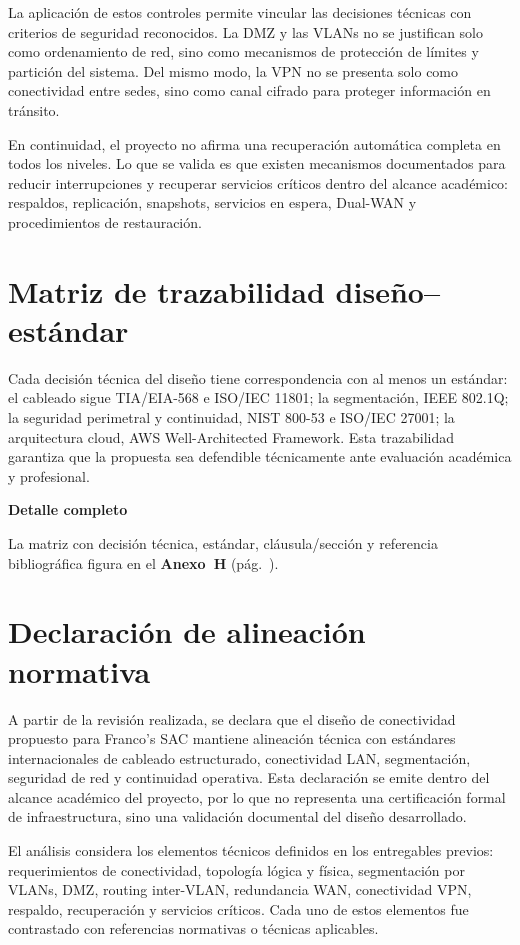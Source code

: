 \documentclass[11pt, a4paper, oneside]{report}
\newenvironment{notabox}[1]{%
  \begin{lrbox}{\notaboxsb}%
  \begin{minipage}{\dimexpr\textwidth-2\fboxsep\relax}%
  \vspace{4pt}\textcolor{upeu_dark}{\textbf{#1}}\\[2pt]\small%
}{%
  \vspace{4pt}%
  \end{minipage}%
  \end{lrbox}%
  \vspace{6pt}\par\noindent\colorbox{upeu_light}{\usebox{\notaboxsb}}\par\vspace{6pt}%
}
\begin{document}
\normalsize

La aplicación de estos controles permite vincular las decisiones técnicas con criterios de seguridad reconocidos. La DMZ y las VLANs no se justifican solo como ordenamiento de red, sino como mecanismos de protección de límites y partición del sistema. Del mismo modo, la VPN no se presenta solo como conectividad entre sedes, sino como canal cifrado para proteger información en tránsito.

En continuidad, el proyecto no afirma una recuperación automática completa en todos los niveles. Lo que se valida es que existen mecanismos documentados para reducir interrupciones y recuperar servicios críticos dentro del alcance académico: respaldos, replicación, snapshots, servicios en espera, Dual-WAN y procedimientos de restauración.

\section{Matriz de trazabilidad diseño--estándar}

Cada decisión técnica del diseño tiene correspondencia con al menos un estándar: el cableado sigue TIA/EIA-568 e ISO/IEC 11801; la segmentación, IEEE 802.1Q; la seguridad perimetral y continuidad, NIST 800-53 e ISO/IEC 27001; la arquitectura cloud, AWS Well-Architected Framework. Esta trazabilidad garantiza que la propuesta sea defendible técnicamente ante evaluación académica y profesional.

\begin{notabox}{Detalle completo}
La matriz con decisión técnica, estándar, cláusula/sección y referencia bibliográfica figura en el \textbf{Anexo~H} (pág.~\pageref{anex:trazabilidad}).
\end{notabox}
\section{Declaración de alineación normativa}

A partir de la revisión realizada, se declara que el diseño de conectividad propuesto para Franco's SAC mantiene alineación técnica con estándares internacionales de cableado estructurado, conectividad LAN, segmentación, seguridad de red y continuidad operativa. Esta declaración se emite dentro del alcance académico del proyecto, por lo que no representa una certificación formal de infraestructura, sino una validación documental del diseño desarrollado.

El análisis considera los elementos técnicos definidos en los entregables previos: requerimientos de conectividad, topología lógica y física, segmentación por VLANs, DMZ, routing inter-VLAN, redundancia WAN, conectividad VPN, respaldo, recuperación y servicios críticos. Cada uno de estos elementos fue contrastado con referencias normativas o técnicas aplicables.
\end{document}
